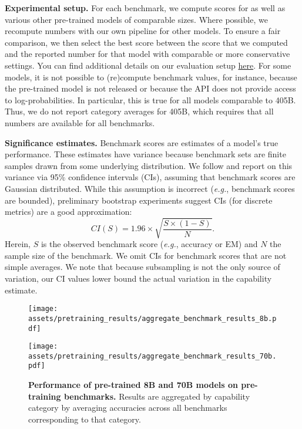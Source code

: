 \textbf{Experimental setup.}
For each benchmark, we compute scores for \llamathree as well as various other pre-trained models of comparable sizes.
Where possible, we recompute numbers with our own pipeline for other models.
To ensure a fair comparison, we then select the best score between the score that we computed and the reported number for that model with comparable or more conservative settings.
You can find additional details on our evaluation setup \href{https://github.com/meta-llama/llama-models/blob/main/models/llama3_1/eval_details.md}{here}.
For some models, it is not possible to (re)compute benchmark values, for instance, because the pre-trained model is not released or because the API does not provide access to log-probabilities. 
In particular, this is true for all models comparable to \llamathree 405B.
Thus, we do not report category averages for \llamathree 405B, which requires that all numbers are available for all benchmarks.

\textbf{Significance estimates.}
Benchmark scores are estimates of a model's true performance.
These estimates have variance because benchmark sets are finite samples drawn from some underlying distribution.
We follow \citet{madaan2024quantifying} and report on this variance via 95\% confidence intervals (CIs), assuming that benchmark scores are Gaussian distributed.
While this assumption is incorrect (\emph{e.g.}, benchmark scores are bounded), preliminary bootstrap experiments suggest CIs (for discrete metrics) are a good approximation:
$$CI(S) = 1.96 \times \sqrt{\frac{S \times (1 - S)}{N}}.$$
Herein, $S$ is the observed benchmark score (\emph{e.g.}, accuracy or EM) and $N$ the sample size of the benchmark.
We omit CIs for benchmark scores that are not simple averages.
We note that because subsampling is not the only source of variation, our CI values lower bound the actual variation in the capability estimate.

\begin{figure}[t]
    \centering
    \begin{minipage}{.48\textwidth}
    \texttt{[image: assets/pretraining\_results/aggregate\_benchmark\_results\_8b.pdf]}
    \end{minipage}\hfill
    \begin{minipage}{.48\textwidth}
    \texttt{[image: assets/pretraining\_results/aggregate\_benchmark\_results\_70b.pdf]}
     \end{minipage}
    \caption{\textbf{Performance of pre-trained \llamathree 8B and 70B models on pre-training benchmarks.} Results are aggregated by capability category by averaging accuracies across all benchmarks corresponding to that category.}
    \label{figure:main_results_pretraining}
\end{figure}


